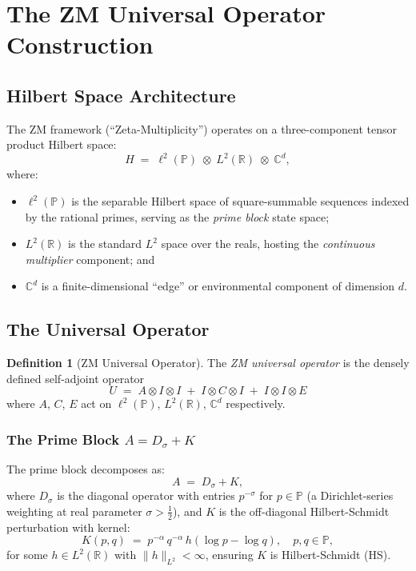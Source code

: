 \documentclass[12pt,letterpaper]{article}
\theoremstyle{definition}
\newtheorem{definition}[theorem]{Definition}
\theoremstyle{remark}
\begin{document}
\section{The ZM Universal Operator Construction}
\label{sec:zm}

\subsection{Hilbert Space Architecture}

The ZM framework (``Zeta-Multiplicity'') operates on a three-component
tensor product Hilbert space:
\[
  H \;=\; \ell^2(\mathbb{P}) \;\otimes\; L^2(\mathbb{R}) \;\otimes\; \mathbb{C}^d,
\]
where:
\begin{itemize}[leftmargin=*]
  \item $\ell^2(\mathbb{P})$ is the separable Hilbert space of square-summable
        sequences indexed by the rational primes, serving as the
        \emph{prime block} state space;
  \item $L^2(\mathbb{R})$ is the standard $L^2$ space over the reals, hosting
        the \emph{continuous multiplier} component; and
  \item $\mathbb{C}^d$ is a finite-dimensional ``edge'' or environmental
        component of dimension $d$.
\end{itemize}

\subsection{The Universal Operator}

\begin{definition}[ZM Universal Operator]
\label{def:zm-universal}
The \emph{ZM universal operator} is the densely defined self-adjoint operator
\[
  U \;=\; A \otimes I \otimes I \;+\; I \otimes C \otimes I
          \;+\; I \otimes I \otimes E
\]
where $A$, $C$, $E$ act on $\ell^2(\mathbb{P})$, $L^2(\mathbb{R})$,
$\mathbb{C}^d$ respectively.
\end{definition}

\subsubsection{The Prime Block \texorpdfstring{$A = D_\sigma + K$}{A}}

The prime block decomposes as:
\[
  A \;=\; D_\sigma + K,
\]
where $D_\sigma$ is the diagonal operator with entries $p^{-\sigma}$ for
$p \in \mathbb{P}$ (a Dirichlet-series weighting at real parameter
$\sigma > \frac{1}{2}$), and $K$ is the off-diagonal Hilbert-Schmidt
perturbation with kernel:
\[
  K(p, q) \;=\; p^{-\alpha}\, q^{-\alpha}\, h\!\left(\log p - \log q\right),
  \quad p,q \in \mathbb{P},
\]
for some $h \in L^2(\mathbb{R})$ with $\|h\|_{L^2} < \infty$, ensuring $K$
is Hilbert-Schmidt (HS).
\end{document}
